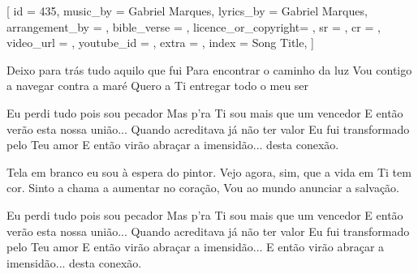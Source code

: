 [
    id                  = {435},
    music_by            = {Gabriel Marques}, %
    lyrics_by           = {Gabriel Marques}, %
    arrangement_by      = {}, %
    bible_verse         = {},
    licence_or_copyright= {},
    sr                  = {},
    cr                  = {},
    video_url           = {}, %
    youtube_id          = {}, %
    extra               = {},
    index               = {Song Title},
]

\beginverse
Deixo para trás tudo aquilo que fui
Para encontrar o caminho da luz
Vou contigo a navegar contra a maré 
Quero a Ti entregar todo o meu ser
\endverse

\beginchorus
Eu perdi tudo pois sou pecador
Mas p’ra Ti sou mais que um vencedor
E então verão esta nossa união...
Quando acreditava já não ter valor
Eu fui transformado pelo Teu amor
E então virão abraçar a imensidão... desta conexão.
\endchorus

\beginverse
Tela em branco eu sou à espera do pintor.
Vejo agora, sim, que a vida em Ti tem cor.
Sinto a chama a aumentar no coração,
Vou ao mundo anunciar a salvação.
\endverse

\beginchorus
Eu perdi tudo pois sou pecador
Mas p’ra Ti sou mais que um vencedor
E então verão esta nossa união...
Quando acreditava já não ter valor
Eu fui transformado pelo Teu amor
E então virão abraçar a imensidão...
E então virão abraçar a imensidão... desta conexão.
\endchorus

\endsong
